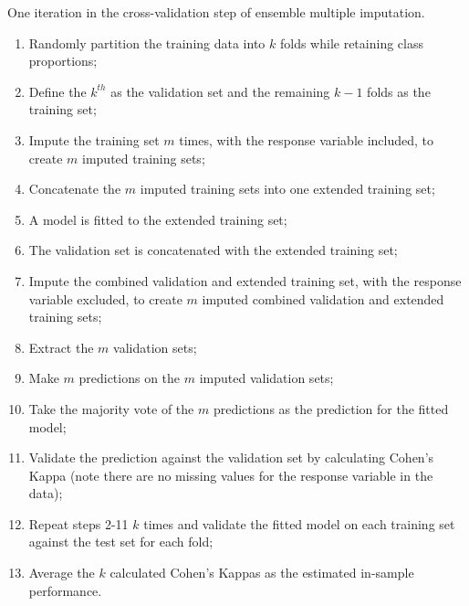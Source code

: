 \documentclass[12pt,]{article}
\begin{document}
\begin{algorithm}[H]
\label{alg:ensemble-imputation}
\caption{One iteration in the cross-validation step of ensemble multiple imputation.}
\DontPrintSemicolon
\SetAlgoLined
\BlankLine

\begin{enumerate}
  \item Randomly partition the training data into $k$ folds while retaining class proportions;
  \item Define the $k^{th}$ as the validation set and the remaining $k-1$ folds as the training set;
  \item Impute the training set $m$ times, with the response variable included, to create $m$ imputed training sets;
  \item Concatenate the $m$ imputed training sets into one extended training set;
  \item A model is fitted to the extended training set;
  \item The validation set is concatenated with the extended training set;
  \item Impute the combined validation and extended training set, with the response variable excluded, to create $m$ imputed combined validation and extended training sets;
  \item Extract the $m$ validation sets;
  \item Make $m$ predictions on the $m$ imputed validation sets;
  \item Take the majority vote of the $m$ predictions as the prediction for the fitted model;
  \item Validate the prediction against the validation set by calculating Cohen's Kappa (note there are no missing values for the response variable in the data);
  \item Repeat steps 2-11 $k$ times and validate the fitted model on each training set against the test set for each fold;
  \item Average the $k$ calculated Cohen's Kappas as the estimated in-sample performance.
\end{enumerate}

\BlankLine
\end{algorithm}
\end{document}
